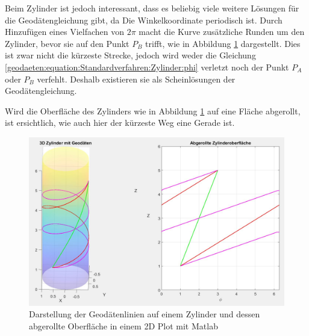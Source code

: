 Beim Zylinder ist jedoch interessant, dass es beliebig viele weitere Lösungen für die Geodätengleichung gibt, da Die Winkelkoordinate periodisch ist.
Durch Hinzufügen eines Vielfachen von $2\pi$ macht die Kurve zusätzliche Runden um den Zylinder, bevor sie auf den Punkt $P_B$ trifft, wie in Abbildung \ref{geodaeten:figure:Linienelemente:Zylinder:figure1} dargestellt.
Dies ist zwar nicht die kürzeste Strecke, jedoch wird weder die Gleichung \eqref{geodaeten:equation:Standardverfahren:Zylinder:phi} verletzt noch der Punkt $P_A$ oder $P_B$ verfehlt.
Deshalb existieren sie als Scheinlösungen der Geodätengleichung.

Wird die Oberfläche des Zylinders wie in Abbildung \ref{geodaeten:figure:Linienelemente:Zylinder:figure1} auf eine Fläche abgerollt, ist ersichtlich, wie auch hier der kürzeste Weg eine Gerade ist.  

\begin{figure}
	\centering
	\includegraphics[width=14cm]{papers/geodaeten/Abbildungen/Standardverfahren/Zylinder}
	\caption{Darstellung der Geodätenlinien auf einem Zylinder und dessen abgerollte Oberfläche in einem 2D Plot mit Matlab}
	\label{geodaeten:figure:Linienelemente:Zylinder:figure1}
\end{figure}
